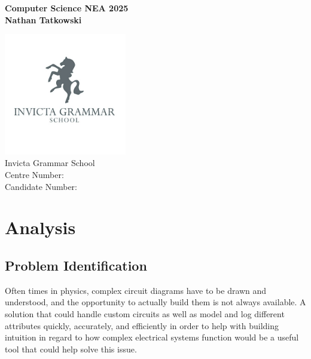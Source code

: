 \documentclass[tikz, 11pt]{article}
\begin{document}
    \pagestyle{fancy}
    \setlength{\headheight}{13.6pt}

    \begin{titlepage}
        \begin{center}
            \vspace*{1cm}
            \Huge
            \textbf{Computer Science NEA 2025} \\
            \vspace*{2cm}
            \LARGE
            \textbf{Nathan Tatkowski}

            \vfill
            \includegraphics*[width=0.4\textwidth]{figures/igsLogo.jpg} \\
            \Large
            Invicta Grammar School \\
            Centre Number: \\
            Candidate Number: 
        \end{center}
    \end{titlepage}

    \tableofcontents
    \pagebreak


    \section{Analysis}
        \subsection{Problem Identification}
            Often times in physics, complex circuit diagrams have to be drawn and understood, and the opportunity to actually build them is not always available. A solution that could handle custom circuits as well as model and log different attributes quickly, accurately, and efficiently in order to help with building intuition in regard to how complex electrical systems function would be a useful tool that could help solve this issue.
\end{document}
